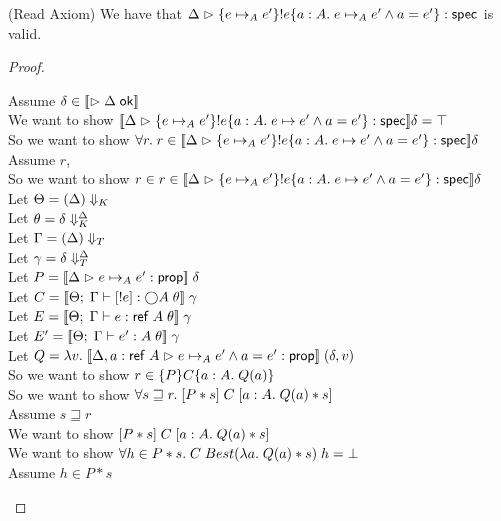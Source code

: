 \begin{lemma}{(Read Axiom)}
We have that $\judgeS{\spec{e \pointsto_A e'}{!e}{a:A}{e \pointsto_A e' \land a = e'}}$ is valid.\end{lemma}
\begin{proof}
  \begin{tabbedproof}
    \oo Assume $\delta \in \interp{\judgeACtx{\Delta}}$ \\
    \ooo We want to show $\interp{\judgeS{\spec{e \pointsto_A e'}{!e}{a:A}{e \pointsto e' \land a = e'}}}\delta = \top$ \\
    \ooo So we want to show $\forall r.\; r \in \interp{\judgeS{\spec{e \pointsto_A e'}{!e}{a:A}{e \pointsto e' \land a = e'}}}\delta$ \\
    \ooo Assume $r$, \\
    \oooo So we want to show $r \in r \in \interp{\judgeS{\spec{e \pointsto_A e'}{!e}{a:A}{e \pointsto e' \land a = e'}}}\delta$ \\
    \oooo Let $\Theta = \restrictkind{\Delta}$ \\
    \oooo Let $\theta = \restricttyenv{\Delta}{\delta}$ \\
    \oooo Let $\Gamma = \restricttype{\Delta}$ \\
    \oooo Let $\gamma = \restrictvals{\Delta}{\delta}$ \\
    \oooo Let $P = \interp{\judgeA{e \pointsto_A e'}{\assert}}\;\delta$ \\
    \oooo Let $C = \interp{\judgeE{\Gamma}{\comp{!e}}{\monad{A}}\;\theta}\;\gamma$ \\
    \oooo Let $E = \interp{\judgeE{\Gamma}{e}{\reftype{A}}\;\theta}\;\gamma$ \\
    \oooo Let $E' = \interp{\judgeE{\Gamma}{e'}{A}\;\theta}\;\gamma$ \\
    \oooo Let $Q = \semfun{v}{\interp{\judgeA[\Delta, a:\reftype{A}]{e \pointsto_A e' \land a = e'}{\assert}}\;(\delta, v)}$ \\
    \oooo So we want to show $r \in \spec{P}{C}{a:A}{Q(a)}$ \\
    \oooo So we want to show $\forall s \sqsupseteq r.\; \basicspec{P*s}{C}{a:A}{Q(a)*s}$ \\
    \oooo Assume $s \sqsupseteq r$ \\
    \ooooo We want to show $\basicspec{P*s}{C}{a:A}{Q(a)*s}$ \\
    \ooooo We want to show $\forall h \in P*s.\; C\;Best(\semfun{a}{Q(a)*s})\;h = \bot$ \\
    \ooooo Assume $h \in P*s$ \\

\end{tabbedproof}
\end{proof}
